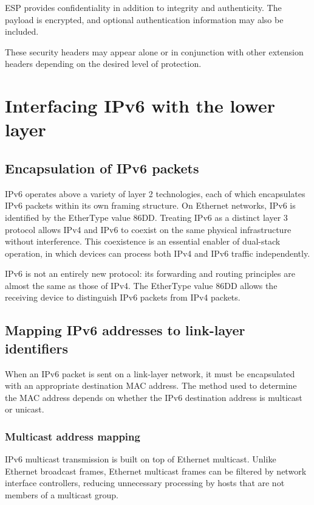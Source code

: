 \documentclass[11pt,a4paper,openany]{report}
\begin{document}
ESP provides confidentiality in addition to integrity and authenticity. The payload is encrypted, and optional authentication information may also be included.

These security headers may appear alone or in conjunction with other extension headers depending on the desired level of protection.

\section{Interfacing IPv6 with the lower layer}

\subsection{Encapsulation of IPv6 packets}

IPv6 operates above a variety of layer 2 technologies, each of which encapsulates IPv6 packets within its own framing structure. On Ethernet networks, IPv6 is identified by the EtherType value 86DD. Treating IPv6 as a distinct layer 3 protocol allows IPv4 and IPv6 to coexist on the same physical infrastructure without interference. This coexistence is an essential enabler of dual-stack operation, in which devices can process both IPv4 and IPv6 traffic independently.

IPv6 is not an entirely new protocol: its forwarding and routing principles are
almost the same as those of IPv4. The EtherType value 86DD allows the receiving
device to distinguish IPv6 packets from IPv4 packets.

\subsection{Mapping IPv6 addresses to link-layer identifiers}

When an IPv6 packet is sent on a link-layer network, it must be encapsulated with an appropriate destination MAC address. The method used to determine the MAC address depends on whether the IPv6 destination address is multicast or unicast.

\subsubsection*{Multicast address mapping}

IPv6 multicast transmission is built on top of Ethernet multicast. Unlike Ethernet broadcast frames, Ethernet multicast frames can be filtered by network interface controllers, reducing unnecessary processing by hosts that are not members of a multicast group.
\end{document}
